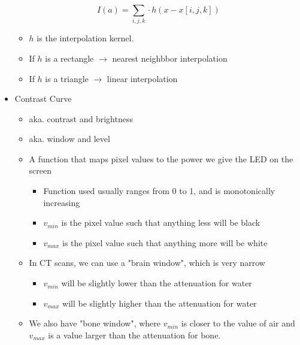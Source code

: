\documentclass[10pt]{article}
\begin{document}
\begin{itemize}
    \[I(a) = \sum_{i, j, k} \cdot h(x - x[i, j, k])\]
    \begin{itemize}
        \item $h$ is the interpolation kernel.
        \item If $h$ is a rectangle $\rightarrow$ nearest neighbbor interpolation
        \item If $h$ is a triangle $\rightarrow$ linear interpolation
    \end{itemize}
    \item Contrast Curve
    \begin{itemize}
        \item aka. contrast and brightness
        \item aka. window and level
        \item A function that maps pixel values to the power we give the LED on the screen
        \begin{itemize}
            \item Function used usually ranges from 0 to 1, and is monotonically increasing
            \item $v_{min}$ is the pixel value such that anything less will be black
            \item $v_{max}$ is the pixel value such that anything more will be white
        \end{itemize}
        \item In CT scans, we can use a "brain window", which is very narrow
        \begin{itemize}
            \item $v_{min}$ will be slightly lower than the attenuation for water
            \item $v_{max}$ will be slightly higher than the attenuation for water
        \end{itemize}
        \item We also have "bone window", where $v_{min}$ is closer to the value of air and $v_{max}$ is a value larger than the attenuation for bone.
    \end{itemize}
\end{itemize}
\end{document}
